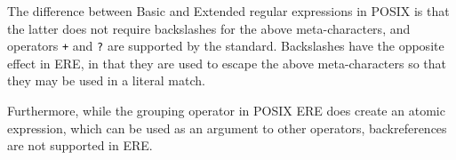 The difference between Basic and Extended regular expressions in POSIX is that
the latter does not require backslashes for the above meta-characters, and
operators \verb'+' and \verb'?' are supported by the standard. Backslashes have
the opposite effect in ERE, in that they are used to escape the above
meta-characters so that they may be used in a literal match.

Furthermore, while the grouping operator in POSIX ERE does create an atomic
expression, which can be used as an argument to other operators, backreferences
are not supported in ERE.


